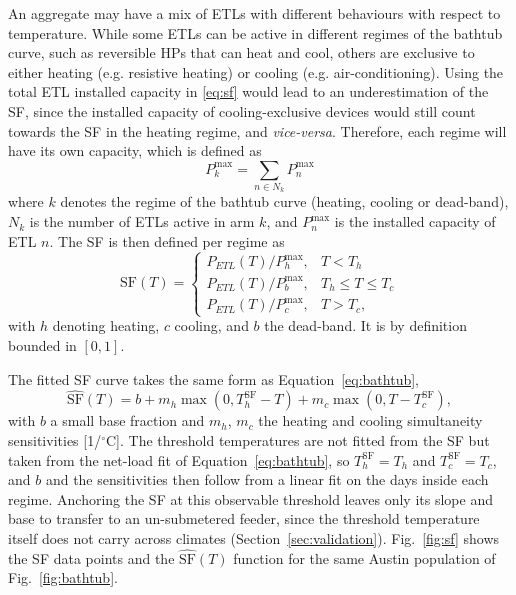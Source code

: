 \documentclass[9pt,journal,a4]{IEEEtran}
\newcommand{\chg}[1]{\textcolor{chgblue}{#1}}
\begin{document}
An aggregate may have a mix of ETLs with different behaviours with respect to temperature. While some ETLs can be active in different regimes of the bathtub curve, such as reversible HPs that can heat and cool, others are exclusive to either heating (e.g. resistive heating) or cooling (e.g. air-conditioning). Using the total ETL installed capacity in \eqref{eq:sf} would lead to an underestimation of the SF, since the installed capacity of cooling-exclusive devices would still count towards the SF in the heating regime, and \emph{vice-versa}. Therefore, each regime will have its own capacity, which is defined as
\begin{equation}
    P_k^{\max} = \sum_{n\in N_k}P_n^{\max}
\end{equation}
where $k$ denotes the regime of the bathtub curve (heating, cooling or dead-band), $N_k$ is the number of ETLs active in arm $k$, and $P_n^{\max}$ is the installed capacity of ETL $n$. The SF is then defined per regime as
\begin{equation}
\mathrm{SF}(T)=
\begin{cases}
{P_{ETL}(T)}/{P_h^{\max}}, & T < T_h\\
{P_{ETL}(T)}/{P_b^{\max}}, & T_h \le T \le T_c \\
{P_{ETL}(T)}/{P_c^{\max}}, & T > T_c,
\end{cases}
\label{eq:sf-piecewise}
\end{equation}
with $h$ denoting heating, $c$ cooling, and $b$ the dead-band. It is by definition bounded in $[0,1]$.

The fitted SF curve takes the same form as Equation~\eqref{eq:bathtub},
\begin{equation}
\hat{\mathrm{SF}}(T) = b + m_h \max(0, T_h^{\mathrm{SF}} - T) + m_c \max(0, T - T_c^{\mathrm{SF}}),
\label{eq:sffit}
\end{equation}
with $b$ a small base fraction and $m_h$, $m_c$ the heating and cooling simultaneity sensitivities [1/$^\circ$C]. \chg{The threshold temperatures are not fitted from the SF but taken from the net-load fit of Equation~\eqref{eq:bathtub}, so $T_h^{\mathrm{SF}} = T_h$ and $T_c^{\mathrm{SF}} = T_c$, and $b$ and the sensitivities then follow from a linear fit on the days inside each regime. Anchoring the SF at this observable threshold leaves only its slope and base to transfer to an un-submetered feeder, since the threshold temperature itself does not carry across climates (Section~\ref{sec:validation}).} Fig.~\ref{fig:sf} shows the SF data points and the $\hat{\mathrm{SF}}(T)$ function for the same Austin population of Fig.~\ref{fig:bathtub}.
\end{document}
